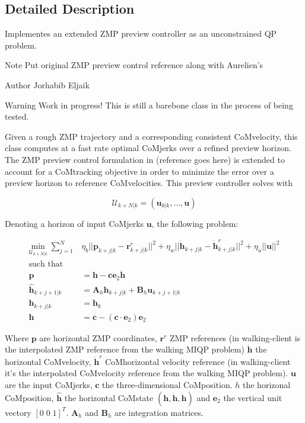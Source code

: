 \subsection{\-Detailed \-Description}
\-Implementes an extended \-Z\-M\-P preview controller as an unconstrained \-Q\-P problem. 

\begin{DoxyNote}{\-Note}
\-Put original \-Z\-M\-P preview control reference along with \-Aurelien's
\end{DoxyNote}
\begin{DoxyAuthor}{\-Author}
\-Jorhabib \-Eljaik
\end{DoxyAuthor}
\cite{ibanezThesis2015}

\begin{DoxyWarning}{\-Warning}
\-Work in progress! \-This is still a barebone class in the process of being tested.
\end{DoxyWarning}
\-Given a rough \-Z\-M\-P trajectory and a corresponding consistent \-Co\-Mvelocity, this class computes at a fast rate optimal \-Co\-Mjerks over a refined preview horizon. \-The \-Z\-M\-P preview control formulation in (reference goes here) is extended to account for a \-Co\-Mtracking objective in order to minimize the error over a preview horizon to reference \-Co\-Mvelocities. \-This preview controller solves with

\[ \mathcal{U}_{k+N|k} = (\mathbf{u}_{k|k}, ... , \mathbf{u}) \]

\-Denoting a horizon of input \-Co\-Mjerks $\mathbf{u}$, the following problem\-:

\begin{align*} \underset{\mathcal{U}_{k+N|k}}{\text{min}} \; \sum_{j=1}^{N} & \eta_b || \mathbf{p}_{k+j|k} - \mathbf{r}_{k+j|k}^r ||^2 + \eta_w ||\mathbf{\dot{h}}_{k+j|k} - \dot{\mathbf{h}}^r_{k+j|k} ||^2 + \eta_u || \mathbf{u} ||^2 \\ \text{such that}&\\ \mathbf{p} &= \mathbf{h} - \mathbf{c}\mathbf{e}_2 \mathbf{\ddot{h}} \\ \mathbf{\hat{h}}_{k+j+1|k} &= \mathbf{A}_h \hat{\mathbf{h}}_{k+j|k} + \mathbf{B}_h \mathbf{u}_{k+j+1|k} \\ \mathbf{h}_{k+j|k} &= \mathbf{h}_k\\ \mathbf{h} &= \mathbf{c} - (\mathbf{c}\cdot\mathbf{e}_2)\mathbf{e}_2 \end{align*}

\-Where $\mathbf{p}$ are horizontal \-Z\-M\-P coordinates, $ \mathbf{r}^r $ \-Z\-M\-P references (in walking-\/client is the interpolated \-Z\-M\-P reference from the walking \-M\-I\-Q\-P problem) $ \mathbf{\dot{h}} $ the horizontal \-Co\-Mvelocity, $ \mathbf{\dot{h}}^r $ \-Co\-Mhorizontal velocity reference (in walking-\/client it's the interpolated \-Co\-Mvelocity reference from the walking \-M\-I\-Q\-P problem). $\mathbf{u}$ are the input \-Co\-Mjerks, $\mathbf{c}$ the three-\/dimensional \-Co\-Mposition. $h$ the horizonal \-Co\-Mposition, $\hat{\mathbf{h}}$ the horizontal \-Co\-Mstate $ (\mathbf{h}, \mathbf{\dot{h}}, \mathbf{\ddot{h}}) $ and $\mathbf{e}_2$ the vertical unit vectory $ [0\;0\;1]^T$. $\mathbf{A}_h$ and $\mathbf{B}_h$ are integration matrices.

